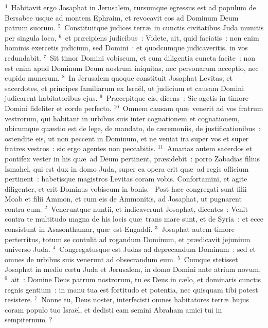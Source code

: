 ${}^{4}$~Habitavit ergo Josaphat in Jerusalem, rursumque egressus est ad populum de Bersabee usque ad montem Ephraim, et revocavit eos ad Dominum Deum patrum suorum.
${}^{5}$~Constituitque judices terr\ae\ in cunctis civitatibus Juda munitis per singula loca,
${}^{6}$~et pr\ae cipiens judicibus~: Videte, ait, quid faciatis~: non enim hominis exercetis judicium, sed Domini~: et quodcumque judicaveritis, in vos redundabit.
${}^{7}$~Sit timor Domini vobiscum, et cum diligentia cuncta facite~: non est enim apud Dominum Deum nostrum iniquitas, nec personarum acceptio, nec cupido munerum.
${}^{8}$~In Jerusalem quoque constituit Josaphat Levitas, et sacerdotes, et principes familiarum ex Isra\"el, ut judicium et causam Domini judicarent habitatoribus ejus.
${}^{9}$~Pr\ae cepitque eis, dicens~: Sic agetis in timore Domini fideliter et corde perfecto.
${}^{10}$~Omnem causam qu\ae\ venerit ad vos fratrum vestrorum, qui habitant in urbibus suis inter cognationem et cognationem, ubicumque qu\ae stio est de lege, de mandato, de c\ae remoniis, de justificationibus~: ostendite eis, ut non peccent in Dominum, et ne veniat ira super vos et super fratres vestros~: sic ergo agentes non peccabitis.
${}^{11}$~Amarias autem sacerdos et pontifex vester in his qu\ae\ ad Deum pertinent, pr\ae sidebit~: porro Zabadias filius Ismahel, qui est dux in domo Juda, super ea opera erit qu\ae\ ad regis officium pertinent~: habetisque magistros Levitas coram vobis. Confortamini, et agite diligenter, et erit Dominus vobiscum in bonis.
~\lettrine[lines=10,image=true,loversize=0.05,lraise=-0.03]{P}{}ost h\ae c congregati sunt filii Moab et filii Ammon, et cum eis de Ammonitis, ad Josaphat, ut pugnarent contra eum.
${}^{2}$~Veneruntque nuntii, et indicaverunt Josaphat, dicentes~: Venit contra te multitudo magna de his locis qu\ae\ trans mare sunt, et de Syria~: et ecce consistunt in Asasonthamar, qu\ae\ est Engaddi.
${}^{3}$~Josaphat autem timore perterritus, totum se contulit ad rogandum Dominum, et pr\ae dicavit jejunium universo Juda.
${}^{4}$~Congregatusque est Judas ad deprecandum Dominum~: sed et omnes de urbibus suis venerunt ad obsecrandum eum.
${}^{5}$~Cumque stetisset Josaphat in medio cœtu Juda et Jerusalem, in domo Domini ante atrium novum,
${}^{6}$~ait~: Domine Deus patrum nostrorum, tu es Deus in c\ae lo, et dominaris cunctis regnis gentium~: in manu tua est fortitudo et potentia, nec quisquam tibi potest resistere.
${}^{7}$~Nonne tu, Deus noster, interfecisti omnes habitatores terr\ae\ hujus coram populo tuo Isra\"el, et dedisti eam semini Abraham amici tui in sempiternum~?
